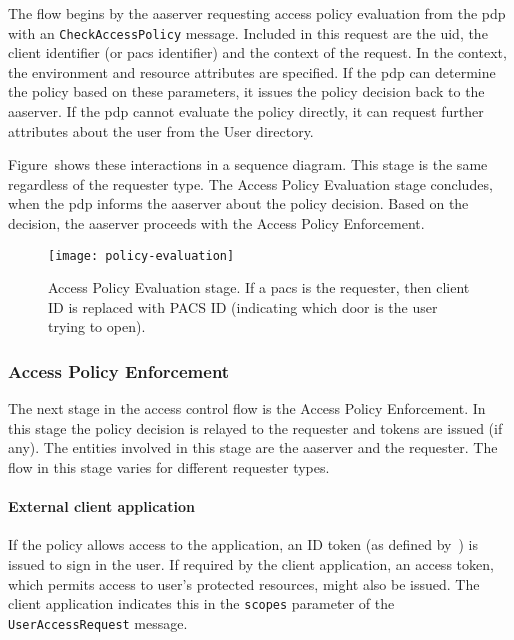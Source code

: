 The flow begins by the \acrshort{aaserver} requesting access policy evaluation from the \acrshort{pdp} with an \texttt{CheckAccessPolicy} message. Included in this request are the \acrshort{uid}, the client identifier (or \acrshort{pacs} identifier) and the context of the request. In the context, the environment and resource attributes are specified. If the \acrshort{pdp} can determine the policy based on these parameters, it issues the policy decision back to the \acrshort{aaserver}. If the \acrshort{pdp} cannot evaluate the policy directly, it can request further attributes about the user from the User directory.

Figure~shows these interactions in a sequence diagram. This stage is the same regardless of the requester type. The Access Policy Evaluation stage concludes, when the \acrshort{pdp} informs the \acrshort{aaserver} about the policy decision. Based on the decision, the \acrshort{aaserver} proceeds with the Access Policy Enforcement.

\begin{figure}[H]
    \centering
    \texttt{[image: policy-evaluation]}
    \caption{Access Policy Evaluation stage. If a \acrshort{pacs} is the requester, then client ID is replaced with PACS ID (indicating which door is the user trying to open).}
    \label{fig:policy-evaluation}
\end{figure}

\subsubsection{Access Policy Enforcement}
The next stage in the access control flow is the Access Policy Enforcement. In this stage the policy decision is relayed to the requester and tokens are issued (if any). The entities involved in this stage are the \acrshort{aaserver} and the requester. The flow in this stage varies for different requester types.

\paragraph{External client application}
If the policy allows access to the application, an ID token (as defined by~\cite{OpenID2014OpenID1}) is issued to sign in the user. If required by the client application, an access token, which permits access to user's protected resources, might also be issued. The client application indicates this in the \texttt{scopes} parameter of the \texttt{UserAccessRequest} message.

